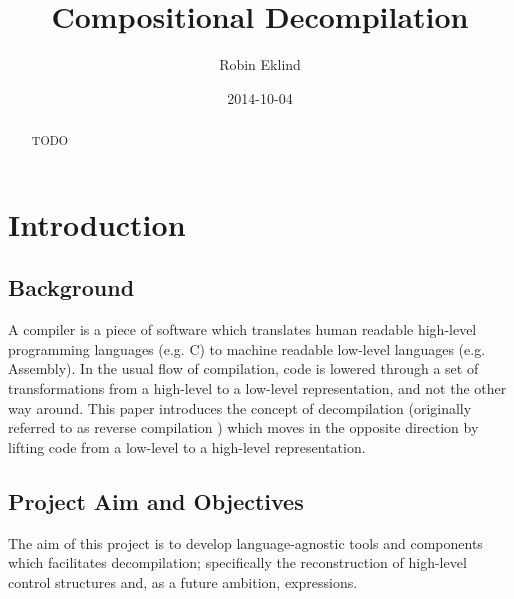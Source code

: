 \documentclass[12pt, a4paper]{article}
\title{Compositional Decompilation} %
\author{Robin Eklind}
\date{2014-10-04}
\begin{document}
\maketitle

\begin{abstract}
TODO
\end{abstract}

\pagebreak

\tableofcontents

\pagebreak



\section{Introduction}


\subsection{Background}

A compiler is a piece of software which translates human readable high-level
programming languages (e.g. C) to machine readable low-level languages (e.g.
Assembly). In the usual flow of compilation, code is lowered through a set of
transformations from a high-level to a low-level representation, and not the
other way around. This paper introduces the concept of decompilation (originally
referred to as reverse compilation \cite{rev_comp}) which moves in the opposite
direction by lifting code from a low-level to a high-level representation.


\subsection{Project Aim and Objectives}

The aim of this project is to develop language-agnostic tools and components
which facilitates decompilation; specifically the reconstruction of high-level
control structures and, as a future ambition, expressions.
\end{document}
